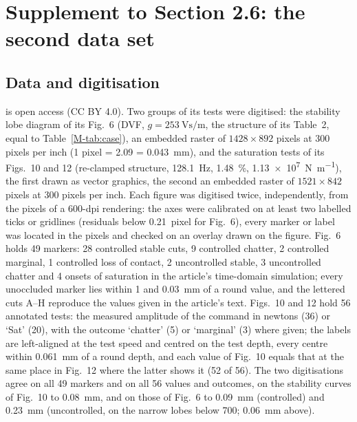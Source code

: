 \section{Supplement to Section 2.6: the second data set}\label{supp:oz25}

\subsection{Data and digitisation}\label{supp:oz25-data}

\citet{ozsoy2025frequency} is open access (CC BY 4.0). Two groups of its tests were digitised: the stability lobe diagram of its Fig.~6 (DVF, $g=\SI{253}{\volt\second\per\metre}$, the structure of its Table~2, equal to Table~\ref{M-tab:case}), an embedded raster of $1428\times892$ pixels at 300 pixels per inch (1 pixel = \SI{2.09}{\rpm} = \SI{0.043}{\milli\metre}), and the saturation tests of its Figs.~10 and 12 (re-clamped structure, \SI{128.1}{\hertz}, \SI{1.48}{\percent}, \SI{1.13e7}{\newton\per\metre}), the first drawn as vector graphics, the second an embedded raster of $1521\times842$ pixels at 300 pixels per inch. Each figure was digitised twice, independently, from the pixels of a 600-dpi rendering: the axes were calibrated on at least two labelled ticks or gridlines (residuals below \SI{0.21}{pixel} for Fig.~6), every marker or label was located in the pixels and checked on an overlay drawn on the figure. Fig.~6 holds 49 markers: 28 controlled stable cuts, 9 controlled chatter, 2 controlled marginal, 1 controlled loss of contact, 2 uncontrolled stable, 3 uncontrolled chatter and 4 onsets of saturation in the article's time-domain simulation; every unoccluded marker lies within \SI{1}{\rpm} and \SI{0.03}{\milli\metre} of a round value, and the lettered cuts A--H reproduce the values given in the article's text. Figs.~10 and 12 hold 56 annotated tests: the measured amplitude of the command in newtons (36) or `Sat' (20), with the outcome `chatter' (5) or `marginal' (3) where given; the labels are left-aligned at the test speed and centred on the test depth, every centre within \SI{0.061}{\milli\metre} of a round depth, and each value of Fig.~10 equals that at the same place in Fig.~12 where the latter shows it (52 of 56). The two digitisations agree on all 49 markers and on all 56 values and outcomes, on the stability curves of Fig.~10 to \SI{0.08}{\milli\metre}, and on those of Fig.~6 to \SI{0.09}{\milli\metre} (controlled) and \SI{0.23}{\milli\metre} (uncontrolled, on the narrow lobes below \SI{700}{\rpm}; \SI{0.06}{\milli\metre} above).


